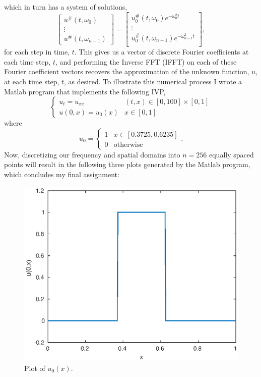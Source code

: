 \documentclass[11pt]{article}
\begin{document}
which in turn has a system of solutions,
	\begin{equation*}
		\begin{bmatrix}
			u^{\#}(t,\omega_0) \\
			\vdots \\
			u^{\#}(t,\omega_{n-1})
		\end{bmatrix}
		=
		\begin{bmatrix}
			u_0^{\#}(t,\omega_0)e^{-\omega_0^2t} \\
			\vdots \\
			u_0^{\#}(t,\omega_{n-1})e^{-\omega_{n-1}^2t} \\
		\end{bmatrix},
	\end{equation*}
for each step in time, $t$. This gives us a vector of discrete Fourier coefficients at each time step, $t$, and
performing the Inverse FFT (IFFT) on each of these Fourier coefficient vectors recovers the approximation of the unknown function, $u$,
at each time step, $t$, as desired.
To illustrate this numerical process I wrote a Matlab program that implements the following IVP,
		\[
		\begin{cases}
			u_t = u_{xx} & (t,x) \in [0,100] \times [0,1] \\
			u(0,x) = u_0(x) & x \in [0,1]
		\end{cases}
		\]
where
\begin{equation*}
	u_0 =
	\begin{cases}
		1 & x \in [0.3725,0.6235] \\
		0 & \text{otherwise}
	\end{cases}.
\end{equation*}
Now, discretizing our frequency and spatial domains into $n=256$ equally spaced points
will result in the following three plots generated by the Matlab program, which concludes my final assignment:
\newpage
\begin{figure}[ht]
	\centering
	\includegraphics{u0}
	\caption{Plot of $u_0(x)$.}
\end{figure}
\end{document}
